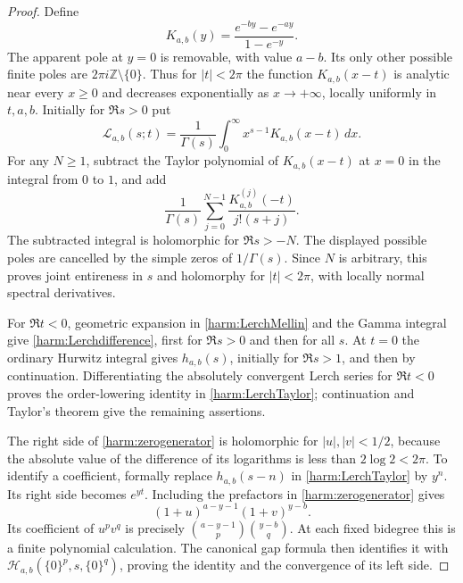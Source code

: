 \begin{proof}
Define
\begin{equation}
 K_{a,b}(y)=\frac{e^{-by}-e^{-ay}}{1-e^{-y}}.
 \label{harm:K}
\end{equation}
The apparent pole at $y=0$ is removable, with value $a-b$.
Its only other possible finite poles are $2\pi i\mathbb Z\setminus\{0\}$.
Thus for $|t|<2\pi$ the function $K_{a,b}(x-t)$ is analytic near
every $x\ge0$ and decreases exponentially as $x\to+\infty$,
locally uniformly in $t,a,b$. Initially for $\Re s>0$ put
\begin{equation}
 \mathcal L_{a,b}(s;t)=\frac1{\Gamma(s)}
                \int_0^\infty x^{s-1}K_{a,b}(x-t)\,dx.
 \label{harm:LerchMellin}
\end{equation}
For any $N\ge1$, subtract the Taylor polynomial of $K_{a,b}(x-t)$
at $x=0$ in the integral from $0$ to $1$, and add
\[
 \frac1{\Gamma(s)}\sum_{j=0}^{N-1}
             \frac{K_{a,b}^{(j)}(-t)}{j!(s+j)}.
\]
The subtracted integral is holomorphic for $\Re s>-N$. The displayed
possible poles are cancelled by the simple zeros of $1/\Gamma(s)$.
Since $N$ is arbitrary, this proves joint entireness in $s$ and
holomorphy for $|t|<2\pi$, with locally normal spectral derivatives.

For $\Re t<0$, geometric expansion in \eqref{harm:LerchMellin}
and the Gamma integral give \eqref{harm:Lerchdifference}, first for
$\Re s>0$ and then for all $s$. At $t=0$ the ordinary Hurwitz
integral gives $h_{a,b}(s)$, initially for $\Re s>1$, and then by
continuation. Differentiating the absolutely convergent Lerch series
for $\Re t<0$ proves the order-lowering identity in
\eqref{harm:LerchTaylor}; continuation and Taylor's theorem give the
remaining assertions.

The right side of \eqref{harm:zerogenerator} is holomorphic for
$|u|,|v|<1/2$, because the absolute value of the difference of its
logarithms is less than $2\log2<2\pi$. To identify a coefficient,
formally replace $h_{a,b}(s-n)$ in \eqref{harm:LerchTaylor} by
$y^n$. Its right side becomes $e^{yt}$. Including the prefactors in
\eqref{harm:zerogenerator} gives
\[
                 (1+u)^{a-y-1}(1+v)^{y-b}.
\]
Its coefficient of $u^pv^q$ is precisely
$\binom{a-y-1}{p}\binom{y-b}{q}$. At each fixed bidegree this is a
finite polynomial calculation. The canonical gap formula then identifies
it with $\mathcal H_{a,b}(\{0\}^p,s,\{0\}^q)$, proving the
identity and the convergence of its left side.
\end{proof}

